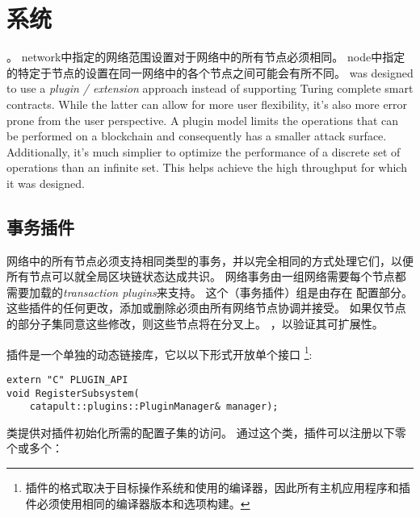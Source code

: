 \section{系统}
\label{sec:system}

\nemquote{
}{}


。
 {network}中指定的网络范围设置对于网络中的所有节点必须相同。
 {node}中指定的特定于节点的设置在同一网络中的各个节点之间可能会有所不同。
\codenamespace was designed to use a \emph{plugin / extension} approach instead of supporting Turing complete smart contracts.
While the latter can allow for more user flexibility, it's also more error prone from the user perspective.
A plugin model limits the operations that can be performed on a blockchain and consequently has a smaller attack surface.
Additionally, it's much simplier to optimize the performance of a discrete set of operations than an infinite set.
This helps \codenamespace achieve the high throughput for which it was designed.

\subsection{事务插件}


网络中的所有节点必须支持相同类型的事务，并以完全相同的方式处理它们，以便所有节点可以就全局区块链状态达成共识。
网络事务由一组网络需要每个节点都需要加载的\emph{transaction plugins}来支持。
这个（事务插件）组是由存在 配置部分。
这些插件的任何更改，添加或删除必须由所有网络节点协调并接受。
如果仅节点的部分子集同意这些修改，则这些节点将在分叉上。
，以验证其可扩展性。

插件是一个单独的动态链接库，它以以下形式开放单个接口
\footnote{插件的格式取决于目标操作系统和使用的编译器，因此所有主机应用程序和插件必须使用相同的编译器版本和选项构建。}:

\begin{lstlisting}
extern "C" PLUGIN_API
void RegisterSubsystem(
	catapult::plugins::PluginManager& manager);
\end{lstlisting}

 类提供对插件初始化所需的配置子集的访问。
通过这个类，插件可以注册以下零个或多个：

